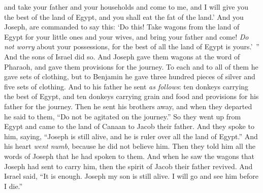 \begin{biblechapter}
\verse and take your father and your households and come to me, and I will give you the best of the land of Egypt, and you shall eat the fat of the land.’
\verse And you Joseph, are commanded to say this: ‘Do this! Take wagons from the land of Egypt for your little ones and your wives, and bring your father and come!
\verse \textit{Do not worry} about your possessions, for the best of all the land of Egypt is yours.’ ”
\verse And the sons of Israel did so. And Joseph gave them wagons at the word of Pharaoh, and gave them provisions for the journey.
\verse To each and to all of them he gave sets of clothing, but to Benjamin he gave three hundred pieces of silver and five sets of clothing.
\verse And to his father he sent \textit{as follows}: ten donkeys carrying the best of Egypt, and ten donkeys carrying grain and food and provisions for his father for the journey.
\verse Then he sent his brothers away, and when they departed he said to them, “Do not be agitated on the journey.”
\verse So they went up from Egypt and came to the land of Canaan to Jacob their father.
\verse And they spoke to him, saying, “Joseph is still alive, and he is ruler over all the land of Egypt.” And his heart \textit{went numb}, because he did not believe him.
\verse Then they told him all the words of Joseph that he had spoken to them. And when he saw the wagons that Joseph had sent to carry him, then the spirit of Jacob their father revived.
\verse And Israel said, “It is enough. Joseph my son is still alive. I will go and see him before I die.”
\end{biblechapter}

